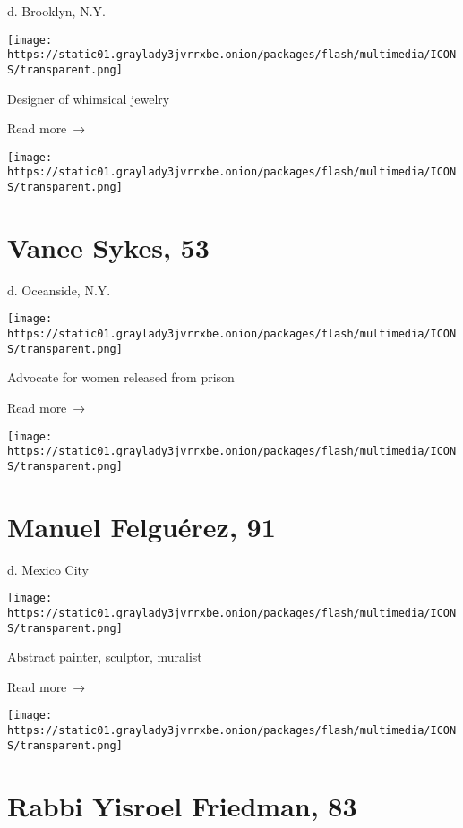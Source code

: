 d. Brooklyn, N.Y.

\texttt{[image: https://static01.graylady3jvrrxbe.onion/packages/flash/multimedia/ICONS/transparent.png]}

Designer of whimsical jewelry

 Read more~→

\href{https://www.nytimes3xbfgragh.onion/2020/06/17/obituaries/vanee-skyes-dead-coronavirus.html}{}

\texttt{[image: https://static01.graylady3jvrrxbe.onion/packages/flash/multimedia/ICONS/transparent.png]}

\hypertarget{vanee-sykes-53}{%
\section{Vanee Sykes, 53}\label{vanee-sykes-53}}

d. Oceanside, N.Y.

\texttt{[image: https://static01.graylady3jvrrxbe.onion/packages/flash/multimedia/ICONS/transparent.png]}

Advocate for women released from prison

 Read more~→

\href{https://www.nytimes3xbfgragh.onion/2020/06/17/arts/manuel-felguerez-dead-coronavirus.html}{}

\texttt{[image: https://static01.graylady3jvrrxbe.onion/packages/flash/multimedia/ICONS/transparent.png]}

\hypertarget{manuel-felguuxe9rez-91}{%
\section{Manuel Felguérez, 91}\label{manuel-felguuxe9rez-91}}

d. Mexico City

\texttt{[image: https://static01.graylady3jvrrxbe.onion/packages/flash/multimedia/ICONS/transparent.png]}

Abstract painter, sculptor, muralist

 Read more~→

\href{https://www.nytimes3xbfgragh.onion/2020/06/16/obituaries/rabbi-friedman-dead-coronavirus.html}{}

\texttt{[image: https://static01.graylady3jvrrxbe.onion/packages/flash/multimedia/ICONS/transparent.png]}

\hypertarget{rabbi-yisroel-friedman-83}{%
\section{Rabbi Yisroel Friedman, 83}\label{rabbi-yisroel-friedman-83}}

